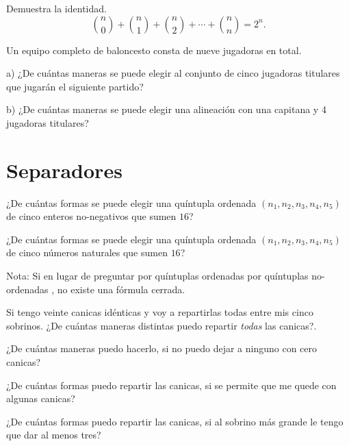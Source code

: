 \begin{ejercicio} Demuestra la identidad.
$${n \choose 0}+{n \choose 1}+{n \choose 2}+\cdots + {n \choose n}=2^n.$$
\end{ejercicio}
\vspace{2cm}


\begin{ejercicio}
Un equipo completo de baloncesto consta de nueve jugadoras en total. 

a) ¿De cuántas maneras se puede elegir al conjunto de cinco jugadoras titulares que 
jugarán el siguiente partido?

b) ¿De cuántas maneras se puede elegir una alineación con una capitana y 4 jugadoras titulares?
\end{ejercicio}
\vspace{2cm}



\section{Separadores}

\begin{ejercicio}
¿De cuántas formas se puede elegir una quíntupla ordenada $(n_1, n_2, n_3, n_4, n_5)$ de cinco enteros no-negativos que sumen $16$?
\end{ejercicio}

\begin{ejercicio}
¿De cuántas formas se puede elegir una quíntupla ordenada $(n_1, n_2, n_3, n_4, n_5)$ de cinco números naturales que sumen $16$?
\end{ejercicio}

Nota: Si en lugar de preguntar por quíntuplas ordenadas  por quíntuplas no-ordenadas , no existe una fórmula cerrada.


\begin{ejercicio}
Si tengo veinte canicas idénticas y voy a repartirlas todas entre mis cinco sobrinos. ¿De cuántas maneras distintas puedo repartir \emph{todas} las canicas?.

¿De cuántas maneras puedo hacerlo, si no puedo dejar a ninguno con cero canicas?

¿De cuántas formas puedo repartir las canicas, si se permite que me quede con algunas canicas?

¿De cuántas formas puedo repartir las canicas, si al sobrino más grande le tengo que dar al menos tres?
\end{ejercicio}
\vspace{4cm}

